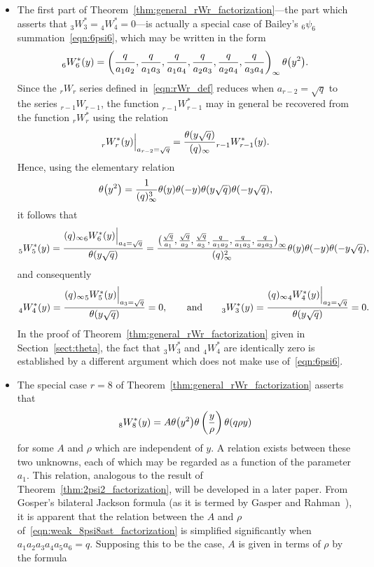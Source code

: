 \documentclass[10pt,a4paper]{amsart}
\numberwithin{equation}{section}
\begin{document}
\begin{Remark}\quad
\begin{itemize}\itemsep=0pt
\item[(i)] The first part of Theorem~\ref{thm:general_rWr_factorization}---the part which asserts that $_3^{}W_3^\ast= {}_4^{}W_4^\ast=0$---is actually a special case of Bailey's $_6\psi_6$ summation~\eqref{eqn:6psi6}, which may be written in the form
\[%
_6^{}W_6^\ast(y) = \left({q \over a_1a_2}, {q \over a_1a_3}, {q \over a_1a_4}, {q \over a_2a_3}, {q \over a_2a_4}, {q \over a_3a_4}\right)_{ \infty} \theta\bigl(y^2\bigr).
\]
Since the $_rW_r$ series defined in~\eqref{eqn:rWr_def} reduces when $a_{r-2}=\sqrt{q}$ to the series $_{r-1}W_{r-1}$, the function $_{r-1}^{}W_{r-1}^\ast$ may in general be recovered from the function $_r^{}W_r^\ast$ using the relation
\[ _r^{}W_r^\ast(y) \Big|_{a_{r-2}=\sqrt{q}} = {\theta(y\sqrt{q}) \over (q)_\infty} {}_{r-1}^{}W_{r-1}^\ast(y). \]
Hence, using the elementary relation
\begin{equation} \label{eqn:theta_squared-argument_identity}
\theta\bigl(y^2\bigr) = {1 \over (q)_\infty^3} \theta(y) \theta(-y) \theta(y\sqrt{q}) \theta(-y\sqrt{q}),
\end{equation}
it follows that
\[ {}_5^{}W_5^\ast(y) = {(q)_\infty {}_6^{}W_6^\ast(y) \Big|_{a_4=\sqrt{q}} \over \theta(y\sqrt{q})} = {\bigl({\sqrt{q} \over a_1}, {\sqrt{q} \over a_2}, {\sqrt{q} \over a_3}, {q \over a_1a_2}, {q \over a_1a_3}, {q \over a_2a_3}\bigr)_\infty \over (q)_\infty^2} \theta(y) \theta(-y) \theta(-y\sqrt{q}), \]
and consequently
\[ _4^{}W_4^\ast(y) = {(q)_\infty {}_5^{}W_5^\ast(y) \Big|_{a_3=\sqrt{q}} \over \theta(y\sqrt{q})} = 0, \qquad \text{and} \qquad _3^{}W_3^\ast(y) = {(q)_\infty {}_4^{}W_4^\ast(y) \Big|_{a_2=\sqrt{q}} \over \theta(y\sqrt{q})} = 0. \]
In the proof of Theorem~\ref{thm:general_rWr_factorization} given in Section~\ref{sect:theta}, the fact that $_3^{}W_3^\ast$ and $_4^{}W_4^\ast$ are identically zero is established by a different argument which does not make use of~\eqref{eqn:6psi6}.
\item[(ii)] The special case $r=8$ of Theorem~\ref{thm:general_rWr_factorization} asserts that
\begin{equation} \label{eqn:weak_8psi8ast_factorization}
_8^{}W_8^\ast(y) = A \theta\bigl(y^2\bigr) \theta\left( {y \over \rho} \right) \theta( q\rho y)
\end{equation}
for some $A$ and $\rho$ which are independent of $y$. A relation exists between these two unknowns, each of which may be regarded as a function of the parameter $a_1$. This relation, analogous to the result of Theorem~\ref{thm:2psi2_factorization}, will be developed in a later paper. From Gosper's bilateral Jackson formula (as it is termed by Gasper and Rahman~\cite[Exercise~5.12]{Gasper2004}), it is apparent that the relation between the $A$ and $\rho$ of~\eqref{eqn:weak_8psi8ast_factorization} is simplified significantly when $a_1a_2a_3a_4a_5a_6=q$. Supposing this to be the case, $A$ is given in terms of $\rho$ by the formula

\end{itemize}
\end{Remark}
\end{document}
